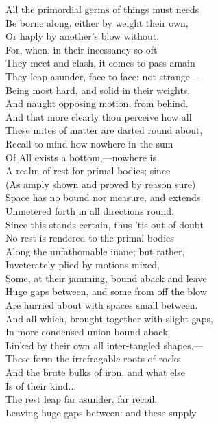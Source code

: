 All the primordial germs of things must needs\\
Be borne along, either by weight their own,\\
Or haply by another's blow without.\\
For, when, in their incessancy so oft\\
They meet and clash, it comes to pass amain\\
They leap asunder, face to face: not strange—\\
Being most hard, and solid in their weights,\\
And naught opposing motion, from behind.\\
And that more clearly thou perceive how all\\
These mites of matter are darted round about,\\
Recall to mind how nowhere in the sum\\
Of All exists a bottom,—nowhere is\\
A realm of rest for primal bodies; since\\
(As amply shown and proved by reason sure)\\
Space has no bound nor measure, and extends\\
Unmetered forth in all directions round.\\
Since this stands certain, thus 'tis out of doubt\\
No rest is rendered to the primal bodies\\
Along the unfathomable inane; but rather,\\
Inveterately plied by motions mixed,\\
Some, at their jamming, bound aback and leave\\
Huge gaps between, and some from off the blow\\
Are hurried about with spaces small between.\\
And all which, brought together with slight gaps,\\
In more condensed union bound aback,\\
Linked by their own all inter-tangled shapes,—\\
These form the irrefragable roots of rocks\\
And the brute bulks of iron, and what else\\
Is of their kind...\\
The rest leap far asunder, far recoil,\\
Leaving huge gaps between: and these supply\\
